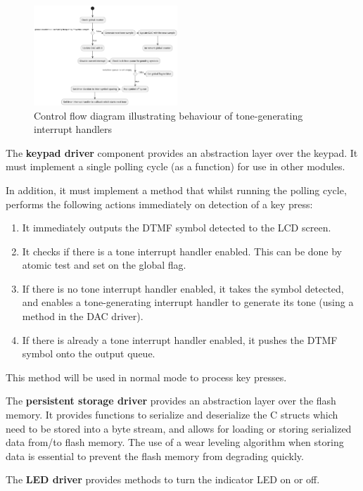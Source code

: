 \documentclass[11pt,a4paper,twocolumn]{scrartcl}
\begin{document}
\begin{figure}
   \centering
   \includegraphics[width=0.48\textwidth]{tone_interrupt_cfd}
   \caption{Control flow diagram illustrating behaviour of tone-generating interrupt handlers}
   \label{fig:tone_interrupt_cfd}
\end{figure}

The \textbf{keypad driver} component provides an abstraction layer over the keypad. It must implement a single polling cycle (as a function) for use in other modules.

In addition, it must implement a method that whilst running the polling cycle, performs the following actions immediately on detection of a key press:
\begin{enumerate}
   \item It immediately outputs the DTMF symbol detected to the LCD screen.
   \item It checks if there is a tone interrupt handler enabled. This can be done by atomic test and set on the global flag.
   \item If there is no tone interrupt handler enabled, it takes the symbol detected, and enables a tone-generating interrupt handler to generate its tone 
      (using a method in the DAC driver).
   \item If there is already a tone interrupt handler enabled, it pushes the DTMF symbol onto the output queue.
\end{enumerate}
This method will be used in normal mode to process key presses.

The \textbf{persistent storage driver} provides an abstraction layer over the flash memory. It provides functions to serialize and deserialize the C structs 
which need to be stored into a byte stream, and allows for loading or storing serialized data from/to flash memory. The use of a wear leveling algorithm when storing data
is essential to prevent the flash memory from degrading quickly\cite{silberschatz2018operating}.

The \textbf{LED driver} provides methods to turn the indicator LED on or off.
\end{document}
